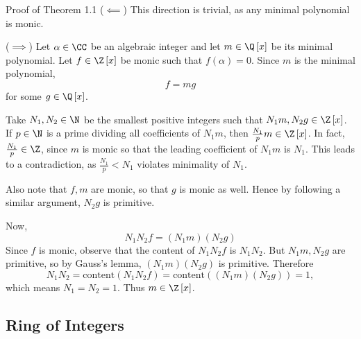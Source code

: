 \documentclass[pmath441]{subfiles}
\begin{document}
    \begin{boxyproof}{Proof of Theorem 1.1}
        ($\impliedby$) This direction is trivial, as any minimal polynomial is monic.

        ($\implies$) Let $\alpha\in\CC$ be an algebraic integer and let $m\in\Q\left[ x \right]$ be its minimal polynomial. Let $f\in\Z\left[ x \right]$ be monic such that $f\left( \alpha \right) = 0$. Since $m$ is the minimal polynomial,
        \begin{equation*}
            f = mg
        \end{equation*}
        for some $g\in\Q\left[ x \right]$. 

        Take $N_1,N_2\in\N$ be the smallest positive integers such that $N_1m, N_2g\in\Z\left[ x \right]$. If $p\in\N$ is a prime dividing all coefficients of $N_1m$, then $\frac{N_1}{p}m\in\Z\left[ x \right]$. In fact, $\frac{N_1}{p}\in\Z$, since $m$ is monic so that the leading coefficient of $N_1m$ is $N_1$. This leads to a contradiction, as $\frac{N_1}{p} < N_1$ violates minimality of $N_1$.

        Also note that $f,m$ are monic, so that $g$ is monic as well. Hence by following a similar argument, $N_2g$ is primitive.

        Now,
        \begin{equation*}
            N_1N_2f = \left( N_1m \right)\left( N_2g \right)
        \end{equation*}
        Since $f$ is monic, observe that the content of $N_1N_2f$ is $N_1N_2$. But $N_1m, N_2g$ are primitive, so by Gauss's lemma, $\left( N_1m \right)\left( N_2g \right)$ is primitive. Therefore
        \begin{equation*}
            N_1N_2 = \text{content}\left( N_1N_2f \right) = \text{content}\left( \left( N_1m \right)\left( N_2g \right) \right) = 1,
        \end{equation*}
        which means $N_1=N_2=1$. Thus $m\in\Z\left[ x \right]$.
    \end{boxyproof}

    \subsection{Ring of Integers}
    
\end{document}
